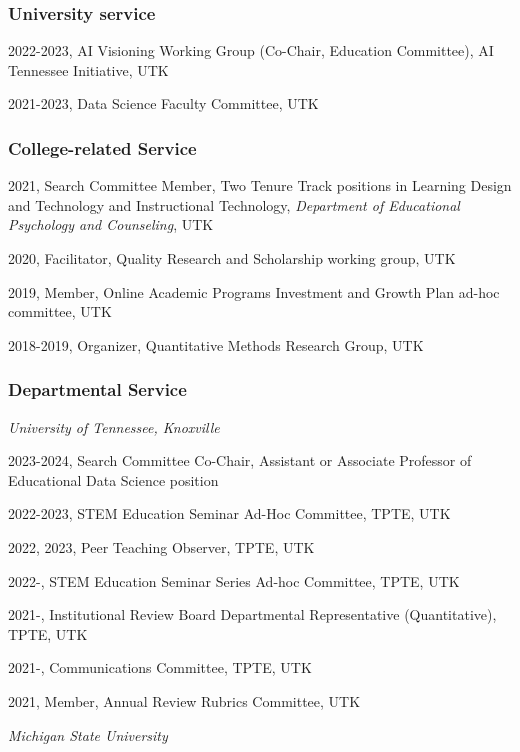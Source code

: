 \documentclass[
  14,
]{article}
\begin{document}
\hypertarget{university-service}{%
\subsubsection{University service}\label{university-service}}

2022-2023, AI Visioning Working Group (Co-Chair, Education Committee),
AI Tennessee Initiative, UTK

2021-2023, Data Science Faculty Committee, UTK

\hypertarget{college-related-service}{%
\subsubsection{College-related Service}\label{college-related-service}}

2021, Search Committee Member, Two Tenure Track positions in Learning
Design and Technology and Instructional Technology, \emph{Department of
Educational Psychology and Counseling}, UTK

2020, Facilitator, Quality Research and Scholarship working group, UTK

2019, Member, Online Academic Programs Investment and Growth Plan ad-hoc
committee, UTK

2018-2019, Organizer, Quantitative Methods Research Group, UTK

\hypertarget{departmental-service}{%
\subsubsection{Departmental Service}\label{departmental-service}}

\emph{University of Tennessee, Knoxville}

2023-2024, Search Committee Co-Chair, Assistant or Associate Professor
of Educational Data Science position

2022-2023, STEM Education Seminar Ad-Hoc Committee, TPTE, UTK

2022, 2023, Peer Teaching Observer, TPTE, UTK

2022-, STEM Education Seminar Series Ad-hoc Committee, TPTE, UTK

2021-, Institutional Review Board Departmental Representative
(Quantitative), TPTE, UTK

2021-, Communications Committee, TPTE, UTK

2021, Member, Annual Review Rubrics Committee, UTK

\emph{Michigan State University}
\end{document}
